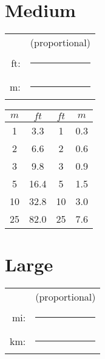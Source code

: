 \documentclass{article}
\begin{document}
\begin{multicols}{2}
\begin{multicols}{2}
\end{multicols}





\section*{\large Medium}



\begin{multicols}{2}








\begin{sideways}
\begin{tabular}{rl}
&(proportional)\\
ft: &	\rule{0.3048in}{1ex} \\
m: &	\rule{1in}{1ex} \\
\end{tabular}
\end{sideways}


\columnbreak

\begin{tabular}{cc|cc}
	$m$ & $ft$ & $ft$ & $m$ \\ \hline
	1			&	3.3			& 1		& 0.3 	\\
	2			&	6.6			& 2		& 0.6 	\\
	3			& 	9.8			& 3		& 0.9 	\\
	5			&	16.4		& 5		& 1.5 	\\
	10			&	32.8		& 10	& 3.0 	\\
	25			&	82.0		& 25	& 7.6 	\\
\end{tabular}

\end{multicols}








\section*{\large Large}



\begin{multicols}{2}







\begin{sideways}
\begin{tabular}{rl}
&(proportional)\\
mi: &	\rule{1in}{1ex} \\
km: &	\rule{0.62 in}{1ex} \\
\end{tabular}
\end{sideways}



\end{multicols}
\end{multicols}
\end{document}
